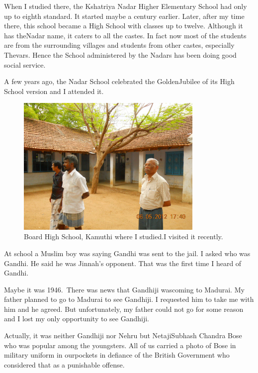 When I studied there, the Kshatriya Nadar Higher Elementary School had 
only up to eighth standard. It started maybe a century earlier. Later, 
after my time there, this school became a High School with classes up to 
twelve. Although it has the\break Nadar name, it caters to all the castes. 
In fact now most of the students are from the surrounding villages and 
students from other castes, especially Thevars. Hence 
the School administered by the Nadars has been doing good social 
service.

A few years ago, the Nadar School celebrated the Golden\break Jubilee of its 
High School version and I attended it.

\begin{figure}[H]
\centering
\includegraphics[width=0.8\textwidth]{images/new-images/04-Rajaji-school.jpg}
\caption{\small{Board High School, Kamuthi where I studied.\break I visited it recently.}}
\end{figure}

At school a Muslim boy was saying Gandhi was sent to the jail. I asked 
who was Gandhi. He said he was Jinnah's opponent. That was the first 
time I heard of Gandhi.

Maybe it was 1946.\ There was news that Gandhiji was\break coming to Madurai. 
My father planned to go to Madurai to see Gandhiji. I requested him to 
take me with him and he agreed. But unfortunately, my father could not 
go for some reason and I lost my only opportunity to see Gandhiji.

Actually, it was neither Gandhiji nor Nehru but Netaji\break Subhash Chandra 
Bose who was popular among the youngsters. All of us carried a photo of 
Bose in military uniform in our\break pockets in defiance of the British 
Government who considered that as a punishable offense.

